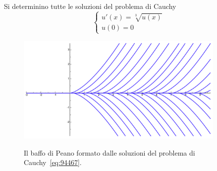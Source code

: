\begin{example}
Si determinino tutte le soluzioni del problema di Cauchy
\begin{equation}
\label{eq:94467}
\begin{cases}
  u'(x) = \sqrt[3]{u(x)}\\
  u(0)=0
\end{cases}
\end{equation}
\end{example}
%
\begin{figure}
\centering
\includegraphics[width=0.9\textwidth]{fig_94467.pdf}
\label{fig:94467}
\caption{Il baffo di Peano formato dalle soluzioni del problema di Cauchy~\eqref{eq:94467}.}
\end{figure}
%
